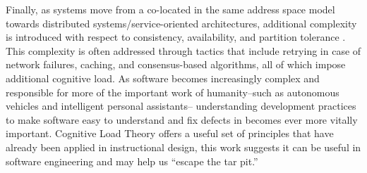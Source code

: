 Finally, as systems move from a co-located in the same address space model towards distributed systems/service-oriented architectures, additional complexity is introduced with respect to consistency, availability, and partition tolerance \cite{Gilbert2002}. This complexity is often addressed through tactics that include retrying in case of network failures, caching, and consensus-based algorithms, all of which impose additional cognitive load. As software becomes increasingly complex and responsible for more of the important work of humanity--such as autonomous vehicles and intelligent personal assistants-- understanding development practices to make software easy to understand and fix defects in becomes ever more vitally important. Cognitive Load Theory offers a useful set of principles that have already been applied in instructional design, this work suggests it can be useful in software engineering and may help us “escape the tar pit.”
